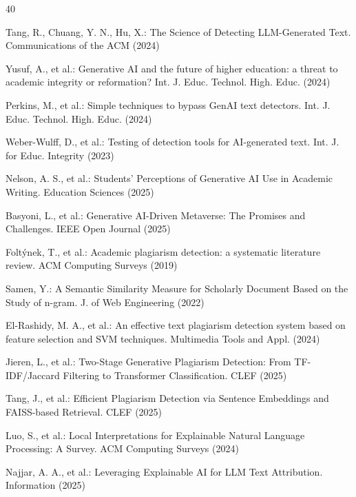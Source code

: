 \documentclass[pdflatex,sn-basic]{sn-jnl}
\begin{document}
\begin{thebibliography}{40}

Tang, R., Chuang, Y. N., Hu, X.: The Science of Detecting LLM-Generated Text. Communications of the ACM (2024)

Yusuf, A., et al.: Generative AI and the future of higher education: a threat to academic integrity or reformation? Int. J. Educ. Technol. High. Educ. (2024)

Perkins, M., et al.: Simple techniques to bypass GenAI text detectors. Int. J. Educ. Technol. High. Educ. (2024)

Weber-Wulff, D., et al.: Testing of detection tools for AI-generated text. Int. J. for Educ. Integrity (2023)

Nelson, A. S., et al.: Students' Perceptions of Generative AI Use in Academic Writing. Education Sciences (2025)

Basyoni, L., et al.: Generative AI-Driven Metaverse: The Promises and Challenges. IEEE Open Journal (2025)

Folt{\'y}nek, T., et al.: Academic plagiarism detection: a systematic literature review. ACM Computing Surveys (2019)

Samen, Y.: A Semantic Similarity Measure for Scholarly Document Based on the Study of n-gram. J. of Web Engineering (2022)

El-Rashidy, M. A., et al.: An effective text plagiarism detection system based on feature selection and SVM techniques. Multimedia Tools and Appl. (2024)

Jieren, L., et al.: Two-Stage Generative Plagiarism Detection: From TF-IDF/Jaccard Filtering to Transformer Classification. CLEF (2025)

Tang, J., et al.: Efficient Plagiarism Detection via Sentence Embeddings and FAISS-based Retrieval. CLEF (2025)

Luo, S., et al.: Local Interpretations for Explainable Natural Language Processing: A Survey. ACM Computing Surveys (2024)

Najjar, A. A., et al.: Leveraging Explainable AI for LLM Text Attribution. Information (2025)


\end{thebibliography}
\end{document}
